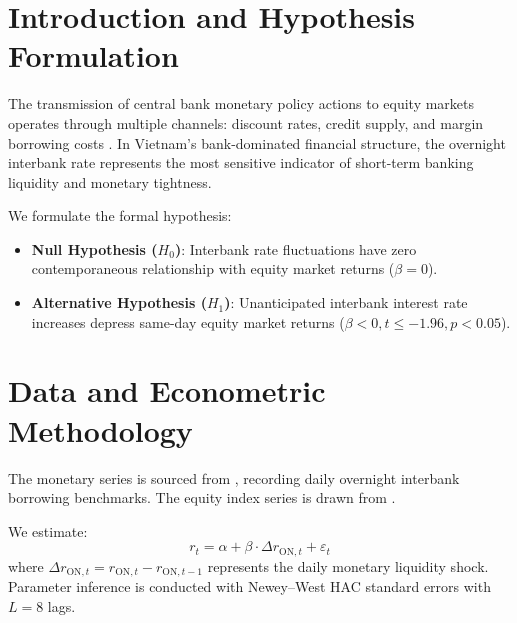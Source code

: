 \documentclass{article}
\begin{document}
\section{Introduction and Hypothesis Formulation}
\label{sec:intro}

The transmission of central bank monetary policy actions to equity markets operates through multiple channels: discount rates, credit supply, and margin borrowing costs \citep{bernanke2005explaining, rigobon2004measuring}. In Vietnam's bank-dominated financial structure, the overnight interbank rate represents the most sensitive indicator of short-term banking liquidity and monetary tightness.

We formulate the formal hypothesis:
\begin{itemize}
    \item \textbf{Null Hypothesis ($H_0$)}: Interbank rate fluctuations have zero contemporaneous relationship with equity market returns ($\beta = 0$).
    \item \textbf{Alternative Hypothesis ($H_1$)}: Unanticipated interbank interest rate increases depress same-day equity market returns ($\beta < 0, t \le -1.96, p < 0.05$).
\end{itemize}

\section{Data and Econometric Methodology}
\label{sec:data}

The monetary series is sourced from , recording daily overnight interbank borrowing benchmarks. The equity index series is drawn from .

We estimate:
\begin{equation}
    r_t = \alpha + \beta \cdot \Delta r_{\text{ON}, t} + \varepsilon_t
\end{equation}
where $\Delta r_{\text{ON}, t} = r_{\text{ON}, t} - r_{\text{ON}, t-1}$ represents the daily monetary liquidity shock. Parameter inference is conducted with Newey--West HAC standard errors \citep{newey1987simple} with $L = 8$ lags.

\end{document}
